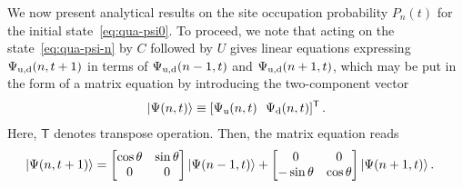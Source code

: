 \documentclass[12pt]{iopart}
\def\ket#1{\mathinner{|{#1}\rangle}}
\begin{document}
We now present analytical results on the site occupation probability $P_n(t)$ for the
initial state~\eqref{eq:qua-psi0}. To proceed, we note that acting on
the state~\eqref{eq:qua-psi-n} by $C$ followed by $U$ gives
linear equations expressing $\Psi_{\rm u,d}(n,t+1)$ in terms of
$\Psi_{\rm u,d}(n-1,t)$ and $\Psi_{\rm u,d}(n+1,t)$, which may be put in the form of a matrix
equation by introducing the two-component vector~\cite{qua-Vishwanath:2000}
\begin{align}
\ket{\Psi(n,t)} \equiv [\Psi_{\rm u}(n,t)~~\Psi_{\rm d}(n,t)]^{\mathsf{T}} \, . \label{eq:qrw-two-comp-vector}
\end{align}
Here, $\mathsf{T}$ denotes
transpose operation. Then, the matrix equation reads
\begin{align}
\ket{\Psi(n,t+1)}
&= \begin{bmatrix} \cos \theta  &\sin \theta \\ 0 & 0 \end{bmatrix}
\ket{\Psi(n-1,t)} + \begin{bmatrix} 0 & 0 \\ -\sin \theta & \cos \theta \end{bmatrix} \ket{\Psi(n+1,t)}.
\label{eq:qua-Psi-eqn}
\end{align}
\end{document}
